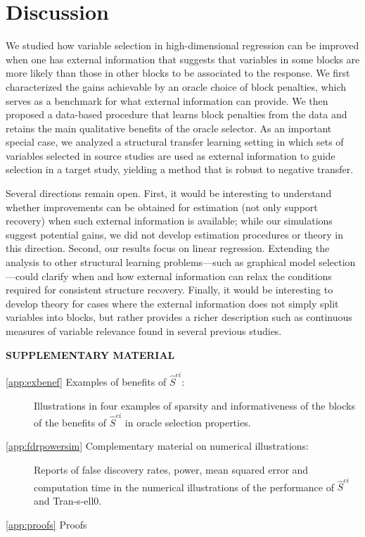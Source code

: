 \documentclass[
  12pt]{article}
\begin{document}
\section{Discussion}
We studied how 
variable selection in high-dimensional regression can be improved when one has external information that suggests that variables in some blocks are more likely than those in other blocks to be associated to the response. 
We first characterized the gains achievable by an oracle choice of block penalties, which serves as a benchmark for what external information can provide. 
We then proposed a data-based procedure that learns block penalties from the data and retains the main qualitative benefits of the oracle selector. 
As an important special case, we analyzed a structural transfer learning setting in which sets of variables selected in source studies are used as external information to guide selection in a target study, yielding a method that is robust to negative transfer.

Several directions remain open. 
First, it would be interesting to understand whether improvements can be obtained for estimation (not only support recovery) when such external information is available; while our simulations suggest potential gains, we did not develop estimation procedures or theory in this direction. 
Second, our results focus on linear regression. Extending the analysis to other structural learning problems—such as graphical model selection—could clarify when and how external information can relax the conditions required for consistent structure recovery.
Finally, it would be interesting to develop theory for cases where the external information does not simply split variables into blocks, but rather provides a richer description such as continuous measures of variable relevance found in several previous studies. 



\label{supplementary-material}
\bigskip

\begin{center}

{\large\bf SUPPLEMENTARY MATERIAL}

\end{center}

\renewcommand{\thesection}{S\arabic{section}}
\renewcommand{\theequation}{S\arabic{equation}}
\renewcommand{\thefigure}{S\arabic{figure}}
\renewcommand{\thetable}{S\arabic{table}}


\begin{description}
\item[\ref{app:exbenef} Examples of benefits of $\hat S^{ei}$:]
Illustrations in four examples of sparsity and informativeness of the blocks of the benefits of $\hat S^{ei}$ in oracle selection properties.
\item[\ref{app:fdrpowersim} Complementary material on numerical illustrations:]
Reports of false discovery rates, power, mean squared error and computation time in the numerical illustrations of the performance of $\hat S^{ei}$ and Tran-s-ell0.
\item[\ref{app:proofs} Proofs]
\end{description}
\end{document}
